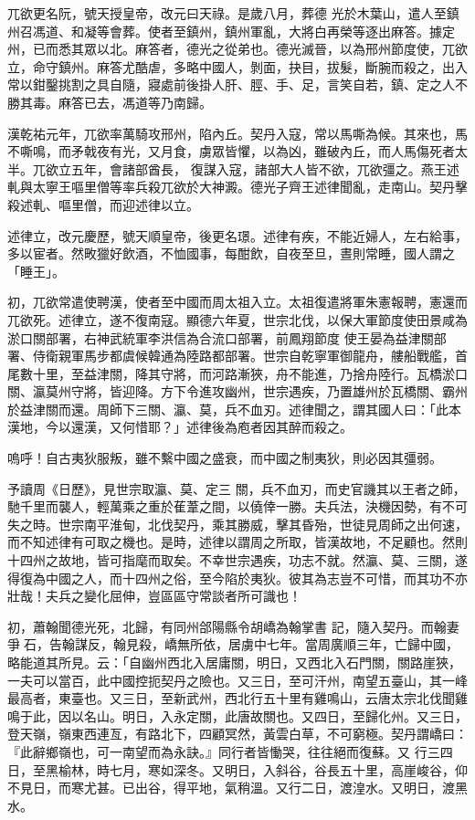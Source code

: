 \begin{pinyinscope}
 兀欲更名阮，號天授皇帝，改元曰天祿。是歲八月，葬德
 光於木葉山，遣人至鎮州召馮道、和凝等會葬。使者至鎮州，鎮州軍亂，大將白再榮等逐出麻答。據定州，已而悉其眾以北。麻答者，德光之從弟也。德光滅晉，以為邢州節度使，兀欲立，命守鎮州。麻答尤酷虐，多略中國人，剝面，抉目，拔髮，斷腕而殺之，出入常以鉗鑿挑割之具自隨，寢處前後掛人肝、脛、手、足，言笑自若，鎮、定之人不勝其毒。麻答已去，馮道等乃南歸。



 漢乾祐元年，兀欲率萬騎攻邢州，陷內丘。契丹入寇，常以馬嘶為候。其來也，馬不嘶鳴，而矛戟夜有光，又月食，虜眾皆懼，以為凶，雖破內丘，而人馬傷死者太半。兀欲立五年，會諸部酋長，
 復謀入寇，諸部大人皆不欲，兀欲彊之。燕王述軋與太寧王嘔里僧等率兵殺兀欲於大神澱。德光子齊王述律聞亂，走南山。契丹擊殺述軋、嘔里僧，而迎述律以立。



 述律立，改元慶歷，號天順皇帝，後更名璟。述律有疾，不能近婦人，左右給事，多以宦者。然畋獵好飲酒，不恤國事，每酣飲，自夜至旦，晝則常睡，國人謂之「睡王」。



 初，兀欲常遣使聘漢，使者至中國而周太祖入立。太祖復遣將軍朱憲報聘，憲還而兀欲死。述律立，遂不復南寇。顯德六年夏，世宗北伐，以保大軍節度使田景咸為淤口關部署，右神武統軍李洪信為合流口部署，前鳳翔節度
 使王晏為益津關部署、侍衛親軍馬步都虞候韓通為陸路都部署。世宗自乾寧軍御龍舟，艛船戰艦，首尾數十里，至益津關，降其守將，而河路漸狹，舟不能進，乃捨舟陸行。瓦橋淤口關、瀛莫州守將，皆迎降。方下令進攻幽州，世宗遇疾，乃置雄州於瓦橋關、霸州於益津關而還。周師下三關、瀛、莫，兵不血刃。述律聞之，謂其國人曰：「此本漢地，今以還漢，又何惜耶？」述律後為庖者因其醉而殺之。



 嗚呼！自古夷狄服叛，雖不繫中國之盛衰，而中國之制夷狄，則必因其彊弱。



 予讀周《日歷》，見世宗取瀛、莫、定三
 關，兵不血刃，而史官譏其以王者之師，馳千里而襲人，輕萬乘之重於萑葦之間，以僥倖一勝。夫兵法，決機因勢，有不可失之時。世宗南平淮甸，北伐契丹，乘其勝威，擊其昏殆，世徒見周師之出何速，而不知述律有可取之機也。是時，述律以謂周之所取，皆漢故地，不足顧也。然則十四州之故地，皆可指麾而取矣。不幸世宗遇疾，功志不就。然瀛、莫、三關，遂得復為中國之人，而十四州之俗，至今陷於夷狄。彼其為志豈不可惜，而其功不亦壯哉！夫兵之變化屈伸，豈區區守常談者所可識也！



 初，蕭翰聞德光死，北歸，有同州郃陽縣令胡嶠為翰掌書
 記，隨入契丹。而翰妻爭石，告翰謀反，翰見殺，嶠無所依，居虜中七年。當周廣順三年，亡歸中國，略能道其所見。云：「自幽州西北入居庸關，明日，又西北入石門關，關路崖狹，一夫可以當百，此中國控扼契丹之險也。又三日，至可汗州，南望五臺山，其一峰最高者，東臺也。又三日，至新武州，西北行五十里有雞鳴山，云唐太宗北伐聞雞鳴于此，因以名山。明日，入永定關，此唐故關也。又四日，至歸化州。又三日，登天嶺，嶺東西連亙，有路北下，四顧冥然，黃雲白草，不可窮極。契丹謂嶠曰：『此辭鄉嶺也，可一南望而為永訣。』同行者皆慟哭，往往絕而復蘇。又
 行三四日，至黑榆林，時七月，寒如深冬。又明日，入斜谷，谷長五十里，高崖峻谷，仰不見日，而寒尤甚。已出谷，得平地，氣稍溫。又行二日，渡湟水。又明日，渡黑水。




\end{pinyinscope}

